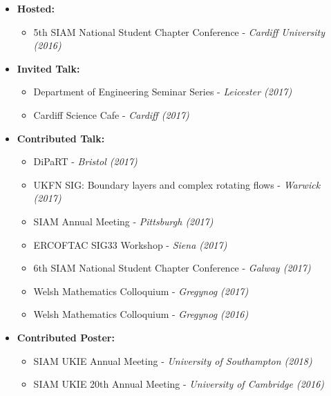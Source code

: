 \documentclass[10pt,a4paper,sans]{moderncv}        %
\begin{document}
\begin{itemize}

\item{\textbf{Hosted:} 
\small{
\begin{itemize}
\vspace{3pt}
\item 5th SIAM National Student Chapter Conference - \textit{Cardiff University (2016)}
\end{itemize}}}

\vspace{6pt}

\item{\textbf{Invited Talk:}

\small{
\begin{itemize}
\vspace{3pt}
\item Department of Engineering Seminar Series - \textit{Leicester (2017)}
\vspace{3pt}
\item Cardiff Science Cafe - \textit{Cardiff (2017)}
\end{itemize}}}

\vspace{6pt}

\item{\textbf{Contributed Talk:}
\begin{multicols}{2}
\small{
\begin{itemize}
\item DiPaRT - \textit{Bristol (2017)}
\vspace{3pt}
\item UKFN SIG: Boundary layers and complex rotating flows - \textit{Warwick (2017)}
\vspace{3pt}
\item SIAM Annual Meeting - \textit{Pittsburgh (2017)}
\vspace{3pt}
\item ERCOFTAC SIG33 Workshop - \textit{Siena (2017)}
\vspace{3pt}
\item 6th SIAM National Student Chapter Conference - \textit{Galway (2017)}
\vspace{3pt}
\item Welsh Mathematics Colloquium - \textit{Gregynog (2017)}
\vspace{3pt}
\item Welsh Mathematics Colloquium - \textit{Gregynog (2016)}
\end{itemize}}\end{multicols}}

\item{\textbf{Contributed Poster:}
\small{
\begin{itemize}
\vspace{3pt}
\item SIAM UKIE Annual Meeting - \textit{University of Southampton (2018)}
\vspace{3pt}
\item SIAM UKIE 20th Annual Meeting - \textit{University of Cambridge (2016)}
\end{itemize}}}

\end{itemize}
\end{document}
